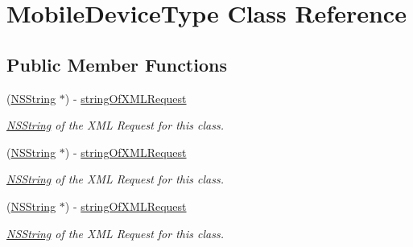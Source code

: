 \hypertarget{interface_mobile_device_type}{
\section{MobileDeviceType Class Reference}
\label{interface_mobile_device_type}
}
\subsection*{Public Member Functions}
\begin{DoxyCompactItemize}
\item 
(\hyperlink{class_n_s_string}{NSString} $\ast$) -\/ \hyperlink{interface_mobile_device_type_a86f29bc7bb3493c498694603fd9835d3}{stringOfXMLRequest}
\begin{DoxyCompactList}\small\item\em \hyperlink{class_n_s_string}{NSString} of the XML Request for this class. \item\end{DoxyCompactList}\item 
(\hyperlink{class_n_s_string}{NSString} $\ast$) -\/ \hyperlink{interface_mobile_device_type_a86f29bc7bb3493c498694603fd9835d3}{stringOfXMLRequest}
\begin{DoxyCompactList}\small\item\em \hyperlink{class_n_s_string}{NSString} of the XML Request for this class. \item\end{DoxyCompactList}\item 
(\hyperlink{class_n_s_string}{NSString} $\ast$) -\/ \hyperlink{interface_mobile_device_type_a86f29bc7bb3493c498694603fd9835d3}{stringOfXMLRequest}
\begin{DoxyCompactList}\small\item\em \hyperlink{class_n_s_string}{NSString} of the XML Request for this class. \item\end{DoxyCompactList}\end{DoxyCompactItemize}
